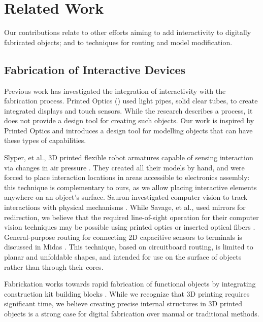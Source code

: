 \section{Related Work}
Our contributions relate to other efforts aiming to add interactivity to digitally fabricated objects; and to techniques for routing and model modification.  

\subsection{Fabrication of Interactive Devices}

Previous work has investigated the integration of interactivity with the fabrication process.  Printed Optics (\cite{Willis-printedoptics}) used light pipes, solid clear tubes, to create integrated displays and touch sensors. While the research describes a process, it does not provide a design tool for creating such objects. Our work is inspired by Printed Optics and introduces a design tool for modelling objects that can have these types of capabilities.  

Slyper, et al., 3D printed flexible robot armatures capable of sensing interaction via changes in air pressure \cite{Slyper-pressure}.  They created all their models by hand, and were forced to place interaction locations in areas accessible to electronics assembly: this technique is complementary to ours, as we allow placing interactive elements anywhere on an object's surface. Sauron investigated computer vision to track interactions with physical mechanisms \cite{Savage-sauron}.  While Savage, et al., used mirrors for redirection, we believe that the required line-of-sight operation for their computer vision techniques may be possible using printed optics or inserted optical fibers .  General-purpose routing for connecting 2D capacitive sensors to terminals is discussed in Midas \cite{Savage-midas}.  This technique, based on circuitboard routing, is limited to planar and unfoldable shapes, and intended for use on the surface of objects rather than through their cores.

Fabrickation works towards rapid fabrication of functional objects by integrating construction kit building blocks \cite{Mueller-fabrickation}.  While we recognize that 3D printing requires significant time, we believe creating precise internal structures in 3D printed objects is a strong case for digital fabrication over manual or traditional methods. 


